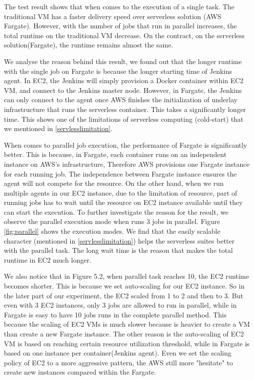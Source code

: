 \par
The test result shows that when comes to the execution of a single task. The traditional VM has a faster delivery speed over serverless solution (AWS Fargate). However, with the number of jobs that run in parallel increases, the total runtime on the traditional VM decrease. On the contract, on the serverless solution(Fargate), the runtime remains almost the same.
\par
We analyse the reason behind this result, we found out that the longer runtime with the single job on Fargate is because the longer starting time of Jenkins agent. In EC2, the Jenkins will simply provision a Docker container within EC2 VM, and connect to the Jenkins master node. However, in Fargate, the Jenkins can only connect to the agent once AWS finishes the initialization of underlay infrastructure that runs the serverless container. This takes a significantly longer time. This shows one of the limitations of serverless computing (cold-start) that we mentioned in \ref{servlesslimitation}.

\par
When comes to parallel job execution, the performance of Fargate is significantly better. This is because, in Fargate, each container runs on an independent instance on AWS's infrastructure, Therefore AWS provisions one Fargate instance for each running job. The independence between Fargate instance ensures the agent will not compete for the resource. On the other hand, when we run multiple agents in our EC2 instance, due to the limitation of resource, part of running jobs has to wait until the resource on EC2 instance available until they can start the execution. To further investigate the reason for the result, we observe the parallel execution mode when runs 3 jobs in parallel. Figure \ref{fig:parallel} shows the execution modes. We find that the easily scalable character (mentioned in \ref{servlesslimitation}) helps the serverless suites better with the parallel task. The long wait time is the reason that makes the total runtime in EC2 much longer.
\par
We also notice that in Figure 5.2, when parallel task reaches 10, the EC2 runtime becomes shorter. This is because we set auto-scaling for our EC2 instance. So in the later part of our experiment, the EC2 scaled from 1 to 2 and then to 3. But even with 3 EC2 instances, only 3 jobs are allowed to run in parallel, while in Fargate is easy to have 10 jobs runs in the complete parallel method. This because the scaling of EC2 VMs is much slower because is heavier to create a VM than create a new Fargate instance. The other reason is the auto-scaling of EC2 VM is based on reaching certain resource utilization threshold, while in Fargate is based on one instance per container(Jenkins agent). Even we set the scaling policy of EC2 to a more aggressive pattern, the AWS still more "hesitate" to create new instances compared within the Fargate.

